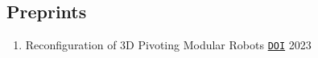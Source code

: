 \documentclass[letterpaper,11pt]{article}
\makeatletter
\newcommand{\resumeSubHeadingListStart}{\begin{itemize}[leftmargin=*]}
\newcommand{\resumeSubHeadingListEnd}{\end{itemize}}
\newcommand{\resumeOneLine}[2]{%
  \item[] #1 #2
}
\newcommand{\pdficon}{\faFilePdf}
\newcommand{\doilabel}{\texttt{DOI}}
\makeatother
\begin{document}
    \subsection*{Preprints}%
  
    \begin{enumerate}
    \setcounter{enumi}{\value{pubnum}}
      
        \resumeOneLine{Reconfiguration of 3D Pivoting Modular Robots%
\quad\href{https://arxiv.org/pdf/2304.09990}{\pdficon}%
%
\quad\href{https://doi.org/10.48550/arXiv.2304.09990}{\doilabel}%
        }{2023}
 
    \setcounter{pubnum}{\value{enumi}}
    \end{enumerate}

\end{document}
